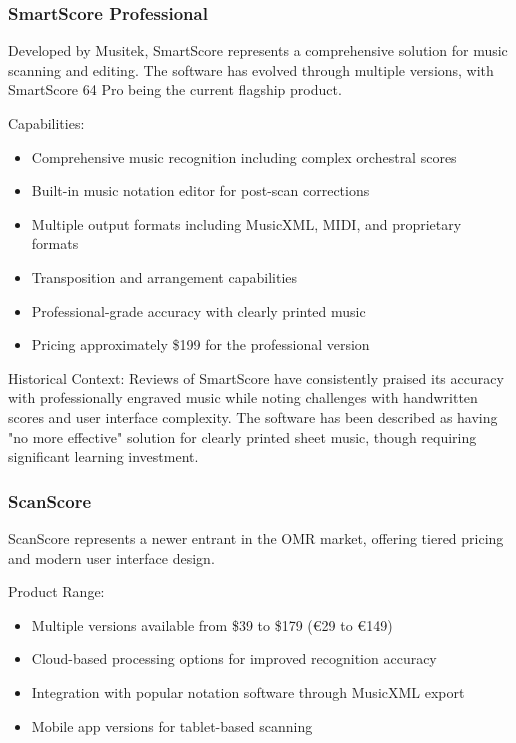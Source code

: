 \subsubsection{SmartScore Professional}
Developed by Musitek, SmartScore represents a comprehensive solution for music scanning and editing. The software has evolved through multiple versions, with SmartScore 64 Pro being the current flagship product.

Capabilities:
\begin{itemize}
    \item Comprehensive music recognition including complex orchestral scores
    \item Built-in music notation editor for post-scan corrections
    \item Multiple output formats including MusicXML, MIDI, and proprietary formats
    \item Transposition and arrangement capabilities
    \item Professional-grade accuracy with clearly printed music
    \item Pricing approximately \$199 for the professional version
\end{itemize}

Historical Context:
Reviews of SmartScore have consistently praised its accuracy with professionally engraved music while noting challenges with handwritten scores and user interface complexity. The software has been described as having "no more effective" solution for clearly printed sheet music, though requiring significant learning investment.

\subsubsection{ScanScore}
ScanScore represents a newer entrant in the OMR market, offering tiered pricing and modern user interface design.

Product Range:
\begin{itemize}
    \item Multiple versions available from \$39 to \$179 (€29 to €149)
    \item Cloud-based processing options for improved recognition accuracy
    \item Integration with popular notation software through MusicXML export
    \item Mobile app versions for tablet-based scanning
\end{itemize}

